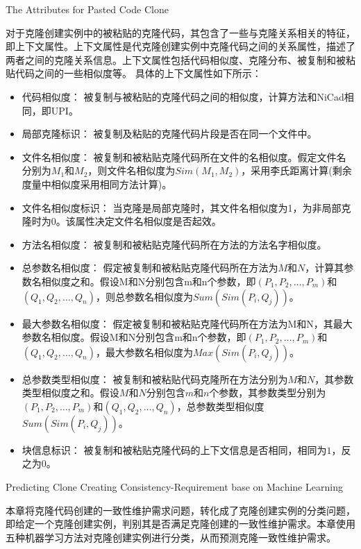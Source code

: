 {The Attributes for Pasted Code Clone}

对于克隆创建实例中的被粘贴的克隆代码，其包含了一些与克隆关系相关的特征，即上下文属性。上下文属性是代克隆创建实例中克隆代码之间的关系属性，描述了两者之间的克隆关系信息。上下文属性包括代码相似度、克隆分布、被复制和被粘贴代码之间的一些相似度等。
具体的上下文属性如下所示：

\begin{itemize}
\item
代码相似度：
被复制与被粘贴的克隆代码之间的相似度，计算方法和NiCad相同，即UPI\cite{roy2008nicad}。
\item
局部克隆标识：
被复制及粘贴的克隆代码片段是否在同一个文件中。
\item
文件名相似度：
被复制和被粘贴克隆代码所在文件的名相似度。假定文件名分别为$M_1$和$M_2$，则文件名相似度为$Sim(M_1,M_2)$，采用李氏距离\cite{levenshtein1966binary}计算(剩余度量中相似度采用相同方法计算)。
\item
文件名相似度标识：
当克隆是局部克隆时，其文件名相似度为1，为非局部克隆时为0。该属性决定文件名相似度是否起效。
\item
方法名相似度：
被复制和被粘贴克隆代码所在方法的方法名字相似度。
\item
总参数名相似度：
假定被复制和被粘贴克隆代码所在方法为$M$和$N$，计算其参数名相似度之和。假设M和N分别包含m和n个参数，即$(P_1,P_2,…,P_m)$和$(Q_1,Q_2,…,Q_n)$，则总参数名相似度为$Sum(Sim(P_i,Q_j))$。
\item
最大参数名相似度：
假定被复制和被粘贴克隆代码所在方法为M和N，其最大参数名相似度。假设M和N分别包含m和n个参数，即$(P_1,P_2,…,P_m)$和$(Q_1,Q_2,…,Q_n)$，最大参数名相似度为$Max(Sim(P_i,Q_j))$。
\item 
总参数类型相似度：
被复制和被粘贴代码克隆所在方法分别为$M$和$N$，其参数类型相似度之和。假设$M$和$N$分别包含$m$和$n$个参数，其参数类型分别为$(P_1,P_2,…,P_m)$和$(Q_1,Q_2,…,Q_n)$，总参数类型相似度$Sum(Sim(P_i,Q_j))$。
\item
块信息标识：
被复制和被粘贴克隆代码的上下文信息是否相同，相同为$1$，反之为$0$。
\end{itemize}

{Predicting Clone Creating Consistency-Requirement base on Machine Learning}
\label{lab-machine}

本章将克隆代码创建的一致性维护需求问题，转化成了克隆创建实例的分类问题，即给定一个克隆创建实例，判别其是否满足克隆创建的一致性维护需求。本章使用五种机器学习方法对克隆创建实例进行分类，从而预测克隆一致性维护需求。

